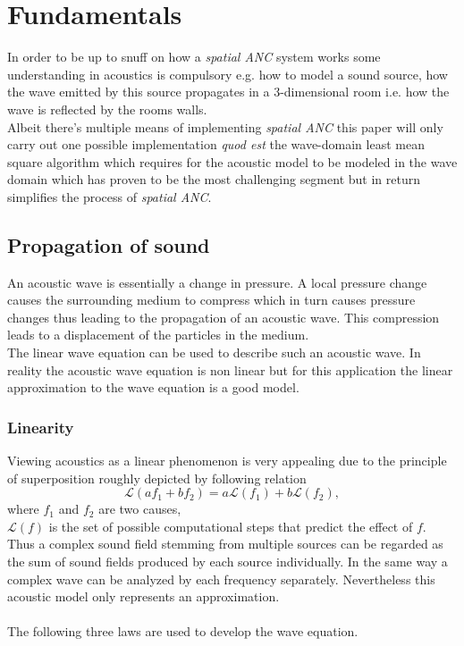 \chapter{Fundamentals}
\label{chap:fundamentals}
In order to be up to snuff on how a \textit{spatial ANC} system works some understanding in acoustics is compulsory e.g. how to model a sound source, how the wave emitted by this source propagates in a 3-dimensional room i.e. how the wave is reflected by the rooms walls.\\
Albeit there's multiple means of implementing \textit{spatial ANC} this paper will only carry out one possible implementation \textit{quod est} the wave-domain least mean square algorithm which requires for the acoustic model to be modeled in the wave domain which has proven to be the most challenging segment but in return simplifies the process of \textit{spatial ANC}.

\section{Propagation of sound}
An acoustic wave is essentially a change in pressure. A local pressure change causes the surrounding medium to compress which in turn causes pressure changes thus leading to the propagation of an acoustic wave. This compression leads to a displacement of the particles in the medium.\\The linear wave equation can be used to describe such an acoustic wave. In reality the acoustic wave equation is non linear but for this application the linear approximation to the wave equation is a good model.\cite{Acoustic}\\
\subsection{Linearity}
Viewing acoustics as a linear phenomenon is very appealing due to the principle of superposition roughly depicted by following relation
\begin{equation}
    \mathcal{L}(af_1+bf_2) = a\mathcal{L}(f_1) + b\mathcal{L}(f_2),
\end{equation}
where
$f_1$ and $f_2$ are two causes,\\
$\mathcal{L}(f)$ is the set of possible computational steps that predict the effect of $f$.\\
Thus a complex sound field stemming from multiple sources can be regarded as the sum of sound fields produced by each source individually. In the same way a complex wave can be analyzed by each frequency separately. Nevertheless this acoustic model only represents an approximation\cite{Rossing2007}.\\
\\
The following three laws are used to develop the wave equation.

